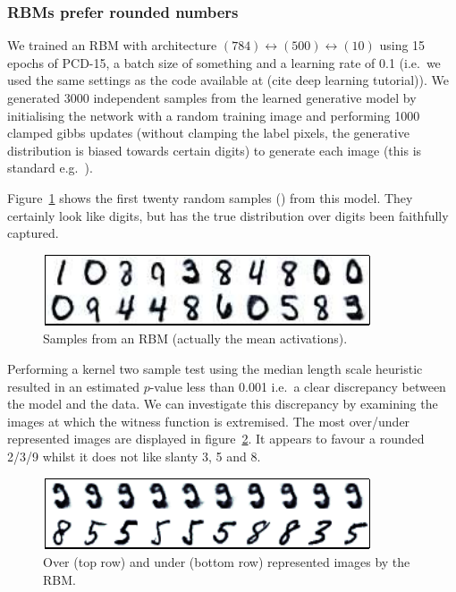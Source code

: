 \documentclass{article}
\def\ie{i.e.\ }
\def\eg{e.g.\ }
\begin{document}
\subsubsection{RBMs prefer rounded numbers}

We trained an RBM with architecture $(784)\leftrightarrow(500)\leftrightarrow(10)$ using 15 epochs of PCD-15, a batch size of something and a learning rate of 0.1 (\ie we used the same settings as the code available at (cite deep learning tutorial)).
We generated 3000 independent samples from the learned generative model by initialising the network with a random training image and performing 1000 clamped gibbs updates (without clamping the label pixels, the generative distribution is biased towards certain digits) to generate each image (this is standard \eg \cite{Hinton2007}).

Figure~\ref{fig:rbm_samples} shows the first twenty random samples () from this model.
They certainly look like digits, but has the true distribution over digits been faithfully captured.

\begin{figure}[ht]
\centering
\includegraphics[width=0.98\columnwidth]{figures/rbm_samples}
\caption{
Samples from an RBM (actually the mean activations).
}
\label{fig:rbm_samples}
\end{figure}

Performing a kernel two sample test using the median length scale heuristic resulted in an estimated $p$-value less than 0.001 \ie a clear discrepancy between the model and the data.
We can investigate this discrepancy by examining the images at which the witness function is extremised.
The most over/under represented images are displayed in figure~\ref{fig:rbm_over_under}.
It appears to favour a rounded 2/3/9 whilst it does not like slanty 3, 5 and 8.

\begin{figure}[ht]
\centering
\includegraphics[width=0.98\columnwidth]{figures/rbm_over_under}
\caption{
Over (top row) and under (bottom row) represented images by the RBM.
}
\label{fig:rbm_over_under}
\end{figure}
\end{document}
